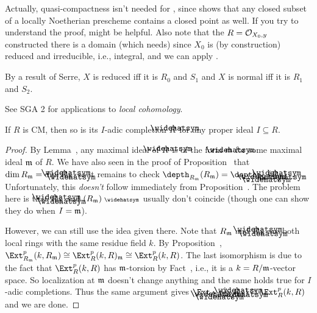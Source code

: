 \documentclass[a4paper,parskip=half,numbers=enddot, DIV=12]{scrreprt}
\begin{document}
\begin{rem*}
	Actually, quasi-compactness isn't needed for , since \cite[]{stacks-project} shows that any closed subset of a locally Noetherian prescheme contains a closed point as well. If you try to understand the proof, \cite[Proposition~2.1.3]{alggeo1} might be helpful. Also note that the $R=\mathcal{O}_{X_0,y}$ constructed there is a domain (which \cite[]{stacks-project} needs) since $X_0$ is (by construction) reduced and irreducible, i.e., integral, and we can apply \cite[Proposition~2.1.4]{alggeo1}.
\end{rem*}
\begin{rem*}
	\begin{alphanumerate}
		\item By a result of Serre, $X$ is reduced iff it is $R_0$ and $S_1$ and $X$ is normal iff it is $R_1$ and $S_2$.
		\item See SGA 2 for applications to \emph{local cohomology}.
	\end{alphanumerate}
\end{rem*}
\begin{prop}
	If $R$ is CM, then so is its $I$-adic completion $\roof{R}$ for any proper ideal $I\subseteq R$.
\end{prop}
\begin{proof}
	By Lemma~, any maximal ideal of $\roof{R}$ is of the form $\roof{\mm}$ for some maximal ideal $\mathfrak{m}$ of $R$. We have also seen in the proof of Proposition~ that $\dim R_\mm=\dim \roof{R}_{\roof{\mm}}$, so it remains to check $\depth_{R_\mm}(R_\mm)=\depth_{\roof{R}_{\roof{\mm}}}(\roof{R}_{\roof{\mm}})$. Unfortunately, this \emph{doesn't} follow immediately from Proposition~. The problem here is that $\roof{R}_{\roof{\mm}}$ and $(R_\mm)^\complete $ usually don't coincide (though one can show they do when $I=\mathfrak{m}$).
	
	However, we can still use the idea given there. Note that $R_{\mathfrak{m}}$ and $\roof{R}_{\roof{\mm}}$ are both local rings with the same residue field $k$. By Proposition~, $\Ext_{R_\mm}^p(k,R_\mm)\cong \Ext_R^p(k,R)_\mm\cong\Ext_R^p(k,R)$. The last isomorphism is due to the fact that $\Ext_R^p(k,R)$ has $\mathfrak{m}$-torsion by Fact~, i.e., it is a $k=R/\mathfrak{m}$-vector space. So localization at $\mathfrak{m}$ doesn't change anything and the same holds true for $I$-adic completions. Thus the same argument gives $\Ext_{\roof{R}_{\roof{\mm}}}(k,\roof{R}_{\roof{\mm}})\cong \Ext_R^p(k,R)$ and we are done.
\end{proof}
\end{document}
